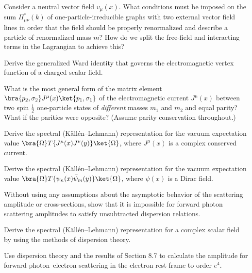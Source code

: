 
\begin{enumerate}
 Consider a neutral vector field $v_\mu(x)$. What conditions must be
imposed on the sum $\Pi^*_{\mu\nu}(k)$ of one-particle-irreducible graphs with
two external vector field lines in order that the field should be properly
renormalized and describe a particle of renormalized mass $m$? How do we split
the free-field and interacting terms in the Lagrangian to achieve this?

 Derive the generalized Ward identity that governs the electromagnetic
vertex function of a charged scalar field.

 What is the most general form of the matrix element
$\bra{p_2,\sigma_2}J^\mu(x)\ket{p_1,\sigma_1}$ of the electromagnetic current
$J^\mu(x)$ between two spin $\tfrac12$ one-particle states of \emph{different}
masses $m_1$ and $m_2$ and equal parity? What if the parities were opposite?
(Assume parity conservation throughout.)

 Derive the spectral (K\"all\'en--Lehmann) representation for the vacuum
expectation value $\bra{\Omega}T\{J^\mu(x)J^\nu(y)\}\ket{\Omega}$, where
$J^\mu(x)$ is a complex conserved current.

 Derive the spectral (K\"all\'en--Lehmann) representation for the vacuum
expectation value
$\bra{\Omega}T\{\psi_n(x)\bar\psi_m(y)\}\ket{\Omega}$, where $\psi(x)$ is a
Dirac field.

 Without using any assumptions about the asymptotic behavior of the
scattering amplitude or cross-sections, show that it is impossible for forward
photon scattering amplitudes to satisfy unsubtracted dispersion relations.

 Derive the spectral (K\"all\'en--Lehmann) representation for a complex
scalar field by using the methods of dispersion theory.

 Use dispersion theory and the results of Section 8.7 to calculate the
amplitude for forward photon--electron scattering in the electron rest frame
to order $e^4$.
\end{enumerate}
